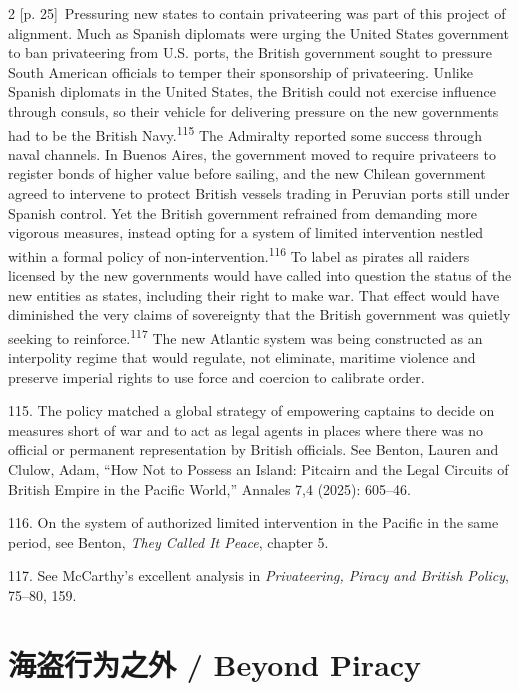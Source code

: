 \documentclass[10pt,a4paper]{article}
\begin{document}
\begin{paracol}{2}
\switchcolumn
{\scriptsize\color{gray} [p. 25]}\ Pressuring new states to contain privateering was part of this project of alignment. Much as Spanish diplomats were urging the United States government to ban privateering from U.S. ports, the British government sought to pressure South American officials to temper their sponsorship of privateering. Unlike Spanish diplomats in the United States, the British could not exercise influence through consuls, so their vehicle for delivering pressure on the new governments had to be the British Navy.\nobreak\textsuperscript{115} The Admiralty reported some success through naval channels. In Buenos Aires, the government moved to require privateers to register bonds of higher value before sailing, and the new Chilean government agreed to intervene to protect British vessels trading in Peruvian ports still under Spanish control. Yet the British government refrained from demanding more vigorous measures, instead opting for a system of limited intervention nestled within a formal policy of non-intervention.\nobreak\textsuperscript{116} To label as pirates all raiders licensed by the new governments would have called into question the status of the new entities as states, including their right to make war. That effect would have diminished the very claims of sovereignty that the British government was quietly seeking to reinforce.\nobreak\textsuperscript{117} The new Atlantic system was being constructed as an interpolity regime that would regulate, not eliminate, maritime violence and preserve imperial rights to use force and coercion to calibrate order.\par{\small 115. The policy matched a global strategy of empowering captains to decide on measures short of war and to act as legal agents in places where there was no official or permanent representation by British officials. See Benton, Lauren and Clulow, Adam, “How Not to Possess an Island: Pitcairn and the Legal Circuits of British Empire in the Pacific World,” Annales 7,4 (2025): 605–46.\par}{\small 116. On the system of authorized limited intervention in the Pacific in the same period, see Benton, \textit{They Called It Peace}, chapter 5.\par}{\small 117. See McCarthy’s excellent analysis in \textit{Privateering, Piracy and British Policy}, 75–80, 159.\par}
\switchcolumn*
\end{paracol}
\section*{海盗行为之外 / Beyond Piracy}
\end{document}
